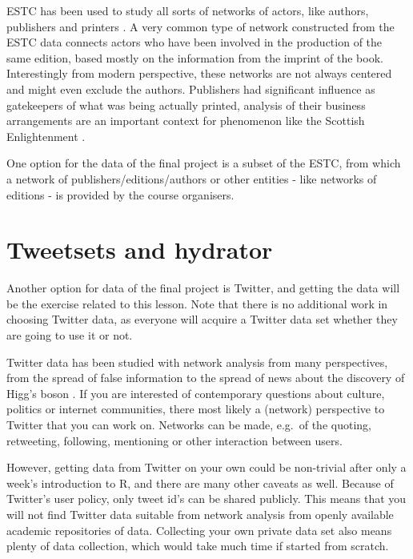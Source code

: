 \documentclass[
]{book}
\begin{document}
ESTC has been used to study all sorts of networks of actors, like authors, publishers and printers \citep{Hill2019}. A very common type of network constructed from the ESTC data connects actors who have been involved in the production of the same edition, based mostly on the information from the imprint of the book. Interestingly from modern perspective, these networks are not always centered and might even exclude the authors. Publishers had significant influence as gatekeepers of what was being actually printed, analysis of their business arrangements are an important context for phenomenon like the Scottish Enlightenment \citep{Sher2006}.

One option for the data of the final project is a subset of the ESTC, from which a network of publishers/editions/authors or other entities - like networks of editions - is provided by the course organisers.

\hypertarget{tweetsets-and-hydrator}{%
\section{Tweetsets and hydrator}\label{tweetsets-and-hydrator}}

Another option for data of the final project is Twitter, and getting the data will be the exercise related to this lesson. Note that there is no additional work in choosing Twitter data, as everyone will acquire a Twitter data set whether they are going to use it or not.

Twitter data has been studied with network analysis from many perspectives, from the spread of false information \citep{Shahi2021} to the spread of news about the discovery of Higg's boson \citep{Domenico2013}. If you are interested of contemporary questions about culture, politics or internet communities, there most likely a (network) perspective to Twitter that you can work on. Networks can be made, e.g.~of the quoting, retweeting, following, mentioning or other interaction between users.

However, getting data from Twitter on your own could be non-trivial after only a week's introduction to R, and there are many other caveats as well. Because of Twitter's user policy, only tweet id's can be shared publicly. This means that you will not find Twitter data suitable from network analysis from openly available academic repositories of data. Collecting your own private data set also means plenty of data collection, which would take much time if started from scratch.
\end{document}
